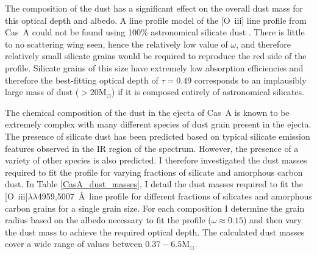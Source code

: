 The composition of the dust has a significant effect on the overall dust mass for this optical depth and albedo.  A line profile model of the [O~{\sc iii}] line profile from Cas~A could not be found using 100\% astronomical silicate dust \citep{Draine1984}.  There is little to no scattering wing seen, hence the relatively low value of $\omega$, and therefore relatively small silicate grains would be required to reproduce the red side of the profile.  Silicate grains of this size have extremely low absorption efficiencies and therefore the best-fitting optical depth of $\tau=0.49$ corresponds to an implausibly large mass of dust ($>20$M$_{\odot}$) if it is composed entirely of astronomical silicates.

The chemical composition of the dust in the ejecta of Cas~A is known to be extremely complex \citep{Arendt2014} with many different species of dust grain present in the ejecta.  The presence of silicate dust has been predicted based on typical silicate emission features observed in the IR region of the spectrum.  However, the presence of a variety of other species is also predicted.  I therefore investigated the dust masses required to fit the profile for varying fractions of silicate and amorphous carbon dust.  In Table \ref{CasA_dust_masses}, I detail the dust masses required to fit the [O~{\sc iii}]$\lambda\lambda$4959,5007~\AA\  line profile for different fractions of silicates and amorphous carbon grains for a single grain size.  For each composition I determine the grain radius based on the albedo necessary to fit the profile ($\omega\approx0.15$) and then vary the dust mass to achieve the required optical depth.  The calculated dust masses cover a wide range of values between $0.37 - 6.5$M$_{\odot}$.   

